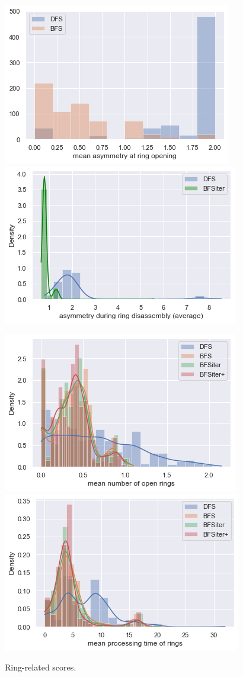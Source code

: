\begin{figure}
	
	\includegraphics[scale=0.8]{mean_ass_beginn_bfs}\includegraphics[scale=0.8]{mean_ass_total_onlyiter}
	
	\includegraphics[scale=0.8]{mean_open_rings_all}\includegraphics[scale=0.8]{mean_processing_all}
	
	\caption{Ring-related scores. }
	
\end{figure}

